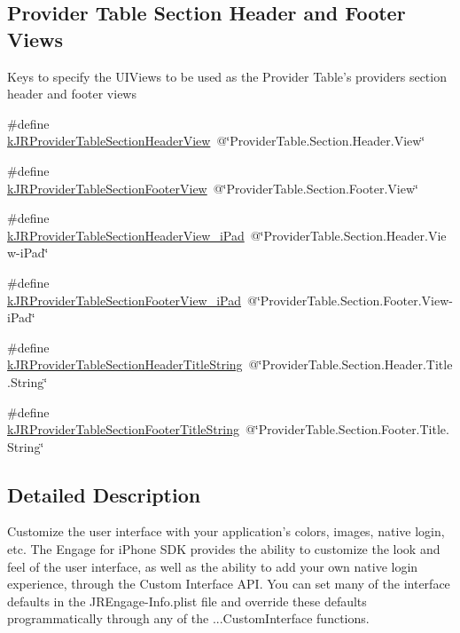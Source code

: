 \subsection*{Provider Table Section Header and Footer Views}
\label{_amgrp0087c3b750e6b14cf3b110df546a77d4}
 Keys to specify the UIViews to be used as the Provider Table's providers section header and footer views \begin{DoxyCompactItemize}
\item 
\#define \hyperlink{group__custom_interface_gaaff8ebdd2b9badb1d0a019a71d47db46}{kJRProviderTableSectionHeaderView}~@\char`\"{}ProviderTable.Section.Header.View\char`\"{}
\item 
\#define \hyperlink{group__custom_interface_ga984c096e9258dea402a1c27ae8bb6c8f}{kJRProviderTableSectionFooterView}~@\char`\"{}ProviderTable.Section.Footer.View\char`\"{}
\item 
\#define \hyperlink{group__custom_interface_ga7dcb3488390fabe1f3a358fb5af1e42c}{kJRProviderTableSectionHeaderView\_\-iPad}~@\char`\"{}ProviderTable.Section.Header.View-\/iPad\char`\"{}
\item 
\#define \hyperlink{group__custom_interface_gaa2196cc44d4e0dc4de9e98248c8a7e10}{kJRProviderTableSectionFooterView\_\-iPad}~@\char`\"{}ProviderTable.Section.Footer.View-\/iPad\char`\"{}
\item 
\#define \hyperlink{group__custom_interface_ga667a6c955993ec24292875f319a7d763}{kJRProviderTableSectionHeaderTitleString}~@\char`\"{}ProviderTable.Section.Header.Title.String\char`\"{}
\item 
\#define \hyperlink{group__custom_interface_ga72e63105251e7d4d6a363e279c2bf775}{kJRProviderTableSectionFooterTitleString}~@\char`\"{}ProviderTable.Section.Footer.Title.String\char`\"{}
\end{DoxyCompactItemize}


\subsection{Detailed Description}
Customize the user interface with your application's colors, images, native login, etc. The Engage for iPhone SDK provides the ability to customize the look and feel of the user interface, as well as the ability to add your own native login experience, through the Custom Interface API. You can set many of the interface defaults in the JREngage-\/Info.plist file and override these defaults programmatically through any of the ...CustomInterface functions.

